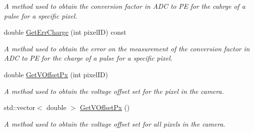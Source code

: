 \begin{DoxyCompactItemize}
\begin{DoxyCompactList}\small\item\em A method used to obtain the conversion factor in A\+DC to PE for the cahrge of a pulse for a specific pixel. \end{DoxyCompactList}\item 
double \hyperlink{classICalibration_acbcfe549397fc403e48ab8201f159eee}{Get\+Err\+Charge} (int pixel\+ID) const
\begin{DoxyCompactList}\small\item\em A method used to obtain the error on the measurement of the conversion factor in A\+DC to PE for the charge of a pulse for a specific pixel. \end{DoxyCompactList}\item 
double \hyperlink{classICalibration_a3ae2db09d81b9373b55ad2b8ea5afc50}{Get\+V\+Offset\+Px} (int pixel\+ID)
\begin{DoxyCompactList}\small\item\em A method used to obtain the voltage offset set for the pixel in the camera. \end{DoxyCompactList}\item 
std\+::vector$<$ double $>$ \hyperlink{classICalibration_a4dbadee1b28bf393a45a8573ad49bc70}{Get\+V\+Offset\+Px} ()
\begin{DoxyCompactList}\small\item\em A method used to obtain the voltage offset set for all pixels in the camera. \end{DoxyCompactList}\end{DoxyCompactItemize}
